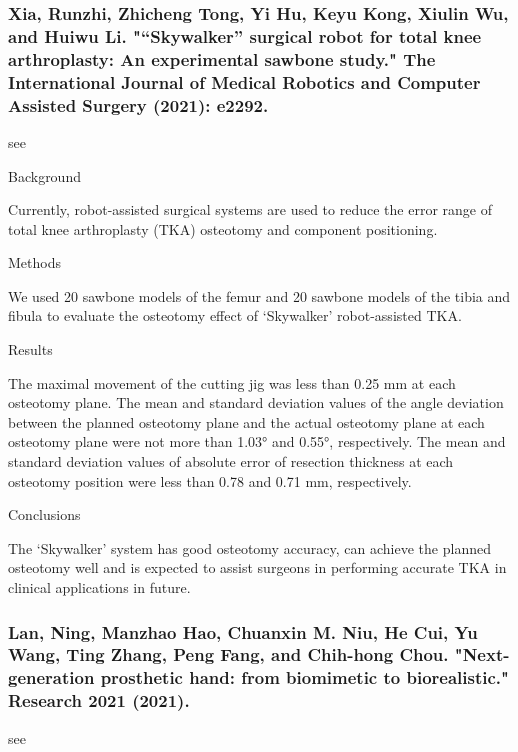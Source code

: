 \documentclass[conference]{IEEEtran}
\begin{document}
\medskip
\subsubsection{Xia, Runzhi, Zhicheng Tong, Yi Hu, Keyu Kong, Xiulin Wu, and Huiwu Li. "“Skywalker” surgical robot for total knee arthroplasty: An experimental sawbone study." The International Journal of Medical Robotics and Computer Assisted Surgery (2021): e2292.}
see \cite{xia2021skywalker}

Background

Currently, robot-assisted surgical systems are used to reduce the error range of total knee arthroplasty (TKA) osteotomy and component positioning.

Methods

We used 20 sawbone models of the femur and 20 sawbone models of the tibia and fibula to evaluate the osteotomy effect of ‘Skywalker’ robot-assisted TKA.

Results

The maximal movement of the cutting jig was less than 0.25 mm at each osteotomy plane. The mean and standard deviation values of the angle deviation between the planned osteotomy plane and the actual osteotomy plane at each osteotomy plane were not more than 1.03° and 0.55°, respectively. The mean and standard deviation values of absolute error of resection thickness at each osteotomy position were less than 0.78 and 0.71 mm, respectively.

Conclusions

The ‘Skywalker’ system has good osteotomy accuracy, can achieve the planned osteotomy well and is expected to assist surgeons in performing accurate TKA in clinical applications in future.

\medskip
\subsubsection{Lan, Ning, Manzhao Hao, Chuanxin M. Niu, He Cui, Yu Wang, Ting Zhang, Peng Fang, and Chih-hong Chou. "Next-generation prosthetic hand: from biomimetic to biorealistic." Research 2021 (2021).}
see \cite{lan2021next}
\end{document}

